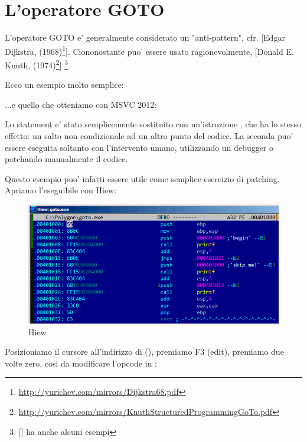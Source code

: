 \chapter{L'operatore GOTO}

L'operatore GOTO e' generalmente considerato un "anti-pattern", cfr. [Edgar Dijkstra,  (1968)\footnote{\url{http://yurichev.com/mirrors/Dijkstra68.pdf}}].
Ciononostante puo' essere usato ragionevolmente, [Donald E. Knuth,  (1974)\footnote{\url{http://yurichev.com/mirrors/KnuthStructuredProgrammingGoTo.pdf}}]
\footnote{[\CNotes] ha anche alcuni esempi}.

Ecco un esempio molto semplice:



...e quello che otteniamo con MSVC 2012:



Lo statement  e' stato semplicemente sostituito con un'istruzione \JMP, che ha lo stesso effetto: un salto non condizionale
ad un altro punto del codice.
La seconda \printf puo' essere eseguita soltanto con l'intervento umano, utilizzando un debugger o patchando manualmente il codice.

\par

\clearpage

Questo esempio puo' infatti essere utile come semplice esercizio di patching. Apriamo l'eseguibile con Hiew:

\begin{figure}[H]
\centering
\includegraphics[scale=\FigScale]{patterns/065_GOTO/hiew1.png}
\caption{Hiew}
\label{fig:goto_hiew1}
\end{figure}

\clearpage
Posizioniamo il cursore all'indirizzo di \JMP (), 
premiamo F3 (edit), premiamo due volte zero, cosi da modificare l'opcode in :

